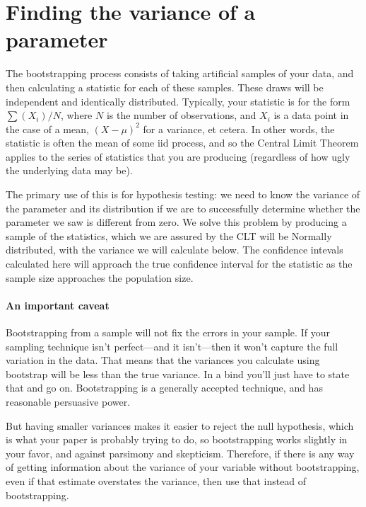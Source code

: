 
\section{Finding the variance of a parameter}
The bootstrapping process consists of taking artificial samples of your
data, and then calculating a statistic for each of these samples. These
draws will be independent and identically distributed.  Typically,
your statistic is for the form $\sum (X_i)/ N$, where  $N$ is the number
of observations, and $X_i$ is a data point in the case of a mean,
$(X-\mu)^2$ for a variance, et cetera. In other words, the statistic
is often the mean of some iid process, and so the Central Limit Theorem
applies to the series of statistics that you are producing (regardless
of how ugly the underlying data may be).

The primary use of this is for hypothesis testing: we need to know the
variance of the parameter and its distribution if we are to successfully
determine whether the parameter we saw is different from zero. We
solve this problem by producing a sample of the statistics, which we
are assured by the CLT will be Normally distributed, with the variance
we will calculate below. The confidence intevals calculated here will
approach the true confidence interval for the statistic
as the sample size approaches the population size.

\paragraph{An important caveat} Bootstrapping from a sample will not fix
the errors in your sample. If your sampling technique isn't perfect---and
it isn't---then it won't capture the full variation in the data. That
means that the variances you calculate using bootstrap will be less than
the true variance. In a bind you'll just have
to state that and go on. Bootstrapping is a generally accepted technique,
and has reasonable persuasive power.

But having smaller variances makes
it easier to reject the null hypothesis, which is what your paper is
probably trying to do, so bootstrapping works slightly in your favor,
and against parsimony and skepticism. Therefore, if there is any way
of getting information about the variance of your variable without
bootstrapping, even if that estimate overstates the variance, then use
that instead of bootstrapping. 


